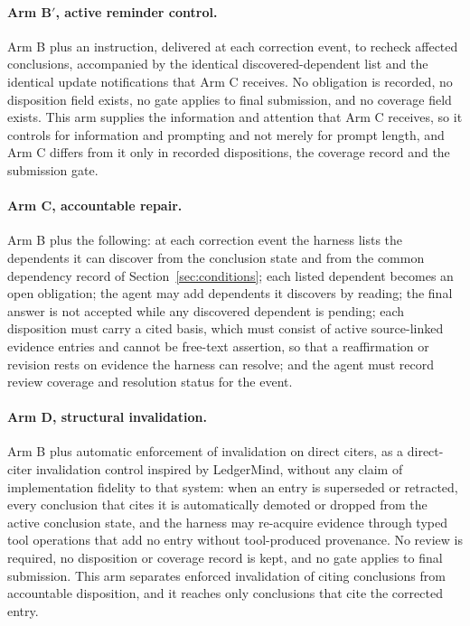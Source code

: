 \documentclass[11pt]{article}
\begin{document}
\paragraph{Arm B$'$, active reminder control.} Arm B plus an instruction, delivered at each correction event, to recheck affected conclusions, accompanied by the identical discovered-dependent list and the identical update notifications that Arm C receives. No obligation is recorded, no disposition field exists, no gate applies to final submission, and no coverage field exists. This arm supplies the information and attention that Arm C receives, so it controls for information and prompting and not merely for prompt length, and Arm C differs from it only in recorded dispositions, the coverage record and the submission gate.

\paragraph{Arm C, accountable repair.} Arm B plus the following: at each correction event the harness lists the dependents it can discover from the conclusion state and from the common dependency record of Section~\ref{sec:conditions}; each listed dependent becomes an open obligation; the agent may add dependents it discovers by reading; the final answer is not accepted while any discovered dependent is pending; each disposition must carry a cited basis, which must consist of active source-linked evidence entries and cannot be free-text assertion, so that a reaffirmation or revision rests on evidence the harness can resolve; and the agent must record review coverage and resolution status for the event.

\paragraph{Arm D, structural invalidation.} Arm B plus automatic enforcement of invalidation on direct citers, as a direct-citer invalidation control inspired by LedgerMind, without any claim of implementation fidelity to that system: when an entry is superseded or retracted, every conclusion that cites it is automatically demoted or dropped from the active conclusion state, and the harness may re-acquire evidence through typed tool operations that add no entry without tool-produced provenance. No review is required, no disposition or coverage record is kept, and no gate applies to final submission. This arm separates enforced invalidation of citing conclusions from accountable disposition, and it reaches only conclusions that cite the corrected entry.
\end{document}

